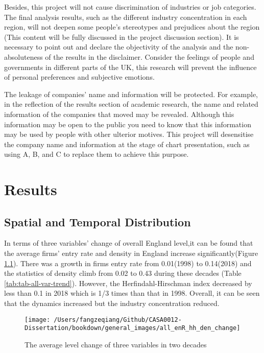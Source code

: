 \documentclass[
  12pt,
  oneside]{book}
\begin{document}
Besides, this project will not cause discrimination of industries or job categories. The final analysis results, such as the different industry concentration in each region, will not deepen some people's stereotypes and prejudices about the region (This content will be fully discussed in the project discussion section). It is necessary to point out and declare the objectivity of the analysis and the non-absoluteness of the results in the disclaimer. Consider the feelings of people and governments in different parts of the UK, this research will prevent the influence of personal preferences and subjective emotions.

The leakage of companies' name and information will be protected. For example, in the reflection of the results section of academic research, the name and related information of the companies that moved may be revealed. Although this information may be open to the public you need to know that this information may be used by people with other ulterior motives. This project will desensitise the company name and information at the stage of chart presentation, such as using A, B, and C to replace them to achieve this purpose.

\hypertarget{results}{%
\chapter{Results}\label{results}}

\hypertarget{spatial-and-temporal-distribution}{%
\section{Spatial and Temporal Distribution}\label{spatial-and-temporal-distribution}}

In terms of three variables' change of overall England level,it can be found that the average firms' entry rate and density in England increase significantly(Figure \ref{fig:fig-all-var-trend}). There was a growth in firms entry rate from 0.01(1998) to 0.14(2018) and the statistics of density climb from 0.02 to 0.43 during these decades (Table \ref{tab:tab-all-var-trend}). However, the Herfindahl-Hirschman index decreased by less than 0.1 in 2018 which is 1/3 times than that in 1998. Overall, it can be seen that the dynamics increased but the industry concentration reduced.

\begin{figure}
\texttt{[image: /Users/fangzeqiang/Github/CASA0012-Dissertation/bookdown/general\_images/all\_enR\_hh\_den\_change]} \caption{The average level change of three variables in two decades}\label{fig:fig-all-var-trend}
\end{figure}
\end{document}
